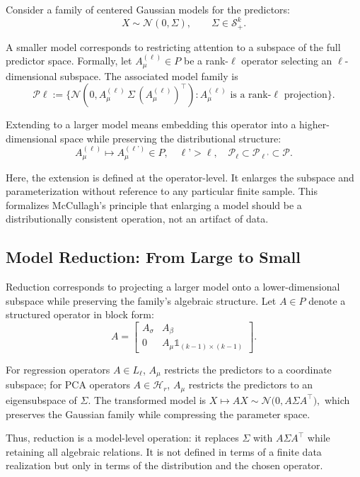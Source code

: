 Consider a family of centered Gaussian models for the predictors:
\[
X \sim \mathcal{N}(0, \Sigma), \qquad \Sigma \in \mathcal{S}_{+}^{k}.
\]

A smaller model corresponds to restricting attention to a subspace of the full predictor space. Formally, let $A_\mu^{(\ell)} \in P$ be a rank-$\ell$ operator selecting an $\ell$-dimensional subspace. The associated model family is
\[
\mathcal{P}\ell := \bigl\{ \mathcal{N}(0, A_\mu^{(\ell)} \, \Sigma \, (A_\mu^{(\ell)})^\top) : A_\mu^{(\ell)} \text{ is a rank-}\ell \text{ projection} \bigr\}.
\]

Extending to a larger model means embedding this operator into a higher-dimensional space while preserving the distributional structure:
\[
A_\mu^{(\ell)} \mapsto A_\mu^{(\ell’)} \in P, \quad \ell’ > \ell, \quad
\mathcal{P}_\ell \subset \mathcal{P}_{\ell’} \subset \mathcal{P}.
\]

Here, the extension is defined at the operator-level. It enlarges the subspace and parameterization without reference to any particular finite sample. This formalizes McCullagh’s principle that enlarging a model should be a distributionally consistent operation, not an artifact of data.

\subsection{Model Reduction: From Large to Small}

Reduction corresponds to projecting a larger model onto a lower-dimensional subspace while preserving the family’s algebraic structure. Let $A \in P$ denote a structured operator in block form:
\[
A = \begin{bmatrix} A_\sigma & A_\beta \\ 0 & A_\mu \mathbb{1}_{(k-1) \times (k-1)}\end{bmatrix}.
\]

For regression operators $A \in L_\ell$, $A_\mu$ restricts the predictors to a coordinate subspace; for PCA operators $A \in \mathcal{H}_r$, $A_\mu$ restricts the predictors to an eigensubspace of $\Sigma$. The transformed model is
$X \mapsto AX \sim \mathcal{N}\bigl(0, A \Sigma A^\top \bigr),$
which preserves the Gaussian family while compressing the parameter space.

Thus, reduction is a model-level operation: it replaces $\Sigma$ with $A \Sigma A^\top$ while retaining all algebraic relations. It is not defined in terms of a finite data realization but only in terms of the distribution and the chosen operator.

